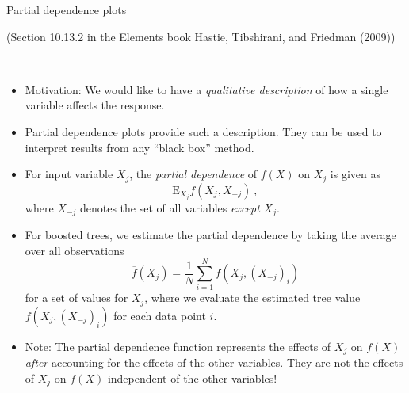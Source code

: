 \documentclass[
  10pt,
  ignorenonframetext,
]{beamer}
\providecommand{\tightlist}{%
  \setlength{\itemsep}{0pt}\setlength{\parskip}{0pt}}
\begin{document}
\begin{frame}
\begin{block}{Partial dependence plots}
\label{partial-dependence-plots}
\scriptsize

(Section 10.13.2 in the Elements book Hastie, Tibshirani, and Friedman
(2009))

\normalsize

\(~\)

\begin{itemize}
\tightlist
\item
  Motivation: We would like to have a \emph{qualitative description} of
  how a single variable affects the response.
\end{itemize}

\vspace{3mm}

\begin{itemize}
\tightlist
\item
  Partial dependence plots provide such a description. They can be used
  to interpret results from any ``black box'' method.
\end{itemize}

\vspace{3mm}

\begin{itemize}
\tightlist
\item
  For input variable \(X_j\), the \emph{partial dependence} of \(f(X)\)
  on \(X_j\) is given as \[\text{E}_{X_j} f(X_j, X_{-j}) \ , \] where
  \(X_{-j}\) denotes the set of all variables \emph{except} \(X_j\).
\end{itemize}
\end{block}
\end{frame}

\begin{frame}
\vspace{2mm}

\begin{itemize}
\tightlist
\item
  For boosted trees, we estimate the partial dependence by taking the
  average over all observations
  \[\overline{f}(X_j) = \frac1N \sum_{i=1}^N f(X_{j},(X_{-j})_i)\] for a
  set of values for \(X_j\), where we evaluate the estimated tree value
  \(f(X_{j},(X_{-j})_i)\) for each data point \(i\).
\end{itemize}

\vspace{4mm}

\begin{itemize}
\tightlist
\item
  Note: The partial dependence function represents the effects of
  \(X_j\) on \(f(X)\) \emph{after} accounting for the effects of the
  other variables. They are not the effects of \(X_j\) on \(f(X)\)
  independent of the other variables!
\end{itemize}

\normalsize
\end{frame}
\end{document}
